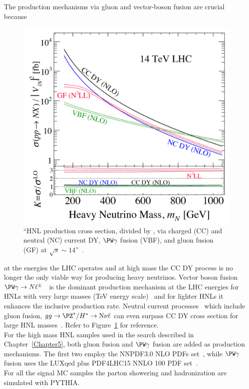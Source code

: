 The production mechanisms via gluon and vector-boson fusion are
crucial because
\begin{figure}
  \includegraphics[clip,trim=0cm 0cm 0.5cm 0.5cm, width=.39\textwidth]{Figures/c4/hnl_lhc_production}
  \caption{``HNL production cross section, divided by \mixpar, via
charged (CC) and neutral (NC) current DY, $\PW \gamma$ fusion (VBF),
and gluon fusion (GF) at $\sqrt{s}
\sim 14$\TeV ''~\cite{Pascoli_2019}.}
  \label{fig:hnl_lhc_graph}
\end{figure} 
 at the energies the LHC operates and at high \hnl mass the CC DY process
is no longer the only viable way for producing heavy neutrinos. 
Vector boson fusion $\PW \gamma \rightarrow N
\ell^{\pm}$~\cite{PhysRevLett.112.081801, Alva:2014gxa,Degrande_2016}
is the dominant production mechanism at the LHC 
energies for HNLs with very large masses
(TeV energy scale)~\cite{Alva:2014gxa,Degrande_2016, Pascoli_2019} and for
lighter HNLs it enhances the inclusive production rate. Neutral current
processes~\cite{PhysRevD.44.1593,WILLENBROCK1985429} which include
gluon fusion, $gg \rightarrow \PZ^{*}/H^{*} \rightarrow \hnl \nu \ell$
can even surpass CC DY cross section for large HNL masses~\cite{PhysRevD.96.055042,
  Pascoli_2019}. Refer to Figure~\ref{fig:hnl_lhc_graph} for
reference.\\
For the high mass HNL samples used in the search described in
Chapter~\ref{Chapter5}, both gluon
fusion and $\PW \gamma$
fusion are added as production mechanisms. 
The first two employ
the NNPDF3.0 NLO PDFs set~\cite{Ball_2015}, while $\PW \gamma$
fusion uses the LUXqed plus PDF4LHC15 NNLO 100
PDF set~\cite{PhysRevLett.117.242002}.\\
For all the signal MC samples the parton showering and hadronization are simulated with PYTHIA. \\


